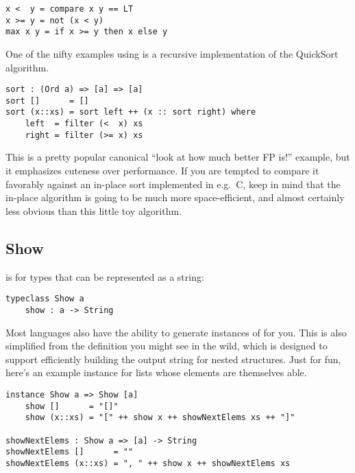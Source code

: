 \begin{lstlisting}[language=pseudoml]
x <  y = compare x y == LT
x >= y = not (x < y)
max x y = if x >= y then x else y
\end{lstlisting}

One of the nifty examples using  is a recursive implementation of the QuickSort algorithm.

\begin{lstlisting}[language=pseudoml]
sort : (Ord a) => [a] => [a]
sort []      = []
sort (x::xs) = sort left ++ (x :: sort right) where
    left  = filter (<  x) xs
    right = filter (>= x) xs
\end{lstlisting}

This is a pretty popular canonical ``look at how much better FP is!'' example, but it emphasizes cuteness over performance. If you are tempted to compare it favorably against an in-place sort implemented in e.g.\ C, keep in mind that the in-place algorithm is going to be much more space-efficient, and almost certainly less obvious than this little toy algorithm.

\subsection{Show}

 is for types that can be represented as a string:

\begin{lstlisting}[language=pseudoml]
typeclass Show a
    show : a -> String
\end{lstlisting}

Most languages also have the ability to generate instances of  for you. This is also simplified from the definition you might see in the wild, which is designed to support efficiently building the output string for nested structures. Just for fun, here's an example instance for lists whose elements are themselves able.

\begin{lstlisting}[language=pseudoml]
instance Show a => Show [a]
    show []      = "[]"
    show (x::xs) = "[" ++ show x ++ showNextElems xs ++ "]"

showNextElems : Show a => [a] -> String
showNextElems []      = ""
showNextElems (x::xs) = ", " ++ show x ++ showNextElems xs
\end{lstlisting}
